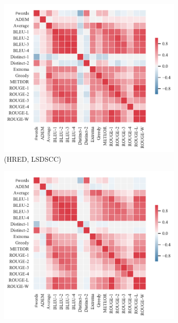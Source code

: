\begin{figure}[htbp]
    \centering
    \begin{subfigure}{0.33\linewidth}
        \centering
        \includegraphics[width=\linewidth]{figure/plot/heatmap/v4/pearson/hred/lsdscc/plot.pdf}
        \caption{(HRED, LSDSCC)}
    \end{subfigure}%
    \begin{subfigure}{0.33\linewidth}
        \centering
        \includegraphics[width=\linewidth]{figure/plot/heatmap/v4/pearson/hred/opensub/plot.pdf}

\end{subfigure}
\end{figure}
